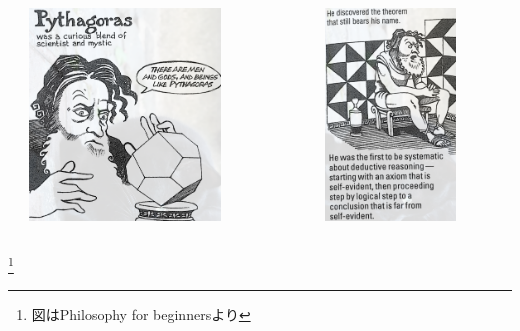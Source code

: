 \documentclass[unicode, 14pt, aspectratio=169]{beamer}
\newcommand\blfootnote[1]{%
  \begingroup
  \renewcommand\thefootnote{}\footnote{#1}%
  \addtocounter{footnote}{-1}%
  \endgroup
}
\begin{document}
\begin{frame}
\begin{columns}
\begin{column}{0.25\textwidth}
\begin{center}
    \end{center}
  \end{column}
  \begin{column}{0.25\textwidth}
    \begin{center}
      \includegraphics[width=0.7\textwidth]{images/pythagoras.png}
    \end{center}
  \end{column}
  \begin{column}{0.25\textwidth}
    \begin{center}
      \includegraphics[width=0.7\textwidth]{images/pythagoras2.png}
    \end{center}
  \end{column}  
\end{columns}
\blfootnote{図はPhilosophy for beginners\supercite{philosophy-for-begginers}より} 
\end{frame}
\end{document}
